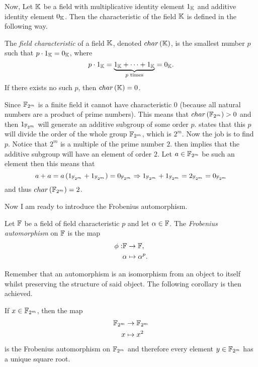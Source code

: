 Now, Let $\mathbb{K}$ be a field with multiplicative identity element $1_{\mathbb{K}}$ and additive identity element $0_{\mathbb{K}}$. Then the characteristic of the field $\mathbb{K}$ is defined in the following way.
\begin{defi}
\label{def:fieldChar}
	The \emph{field characteristic} of a field $\mathbb{K}$, denoted $char\left(\mathbb{K}\right)$, is the smallest number $p$ such that $p \cdot 1_{\mathbb{K}} = 0_{\mathbb{K}}$, where
	\[	
		p \cdot 1_{\mathbb{K}} = \underbrace{1_{\mathbb{K}} + \cdots + 1_{\mathbb{K}}}_{\text{$p$ times}} = 0_{\mathbb{K}}.
	\]
	If there exists no such $p$, then $char\left(\mathbb{K}\right) = 0$.
\end{defi}
Since $\mathbb{F}_{2^m}$ is a finite field it cannot have characteristic $0$ (because all natural numbers are a product of prime numbers). This means that $char\left(\mathbb{F}_{2^m}\right) > 0$ and then $1_{\mathbb{F}_{2^m}}$ will generate an additive subgroup of some order $p$.  states that this $p$ will divide the order of the whole group $\mathbb{F}_{2^m}$, which is $2^m$. Now the job is to find $p$. Notice that $2^m$ is a multiple of the prime number $2$.  then implies that the additive subgroup will have an element of order $2$. Let $a \in \mathbb{F}_{2^m}$ be such an element then this means that
\begin{equation}
\label{eq:cauchyHelper}
	a+a = a\left(1_{\mathbb{F}_{2^m}}+1_{\mathbb{F}_{2^m}}\right) = 0_{\mathbb{F}_{2^m}} \Rightarrow 1_{\mathbb{F}_{2^m}}+1_{\mathbb{F}_{2^m}} = 2_{\mathbb{F}_{2^m}} = 0_{\mathbb{F}_{2^m}}
\end{equation}
and thus $char\left(\mathbb{F}_{2^m}\right) = 2$.

Now I am ready to introduce the Frobenius automorphism.
\begin{defi}
	Let $\mathbb{F}$ be a field of field characteristic $p$ and let $\alpha \in \mathbb{F}$. The \emph{Frobenius automorphism} on $\mathbb{F}$ is the map
	\begin{align*}
		\phi: &\mathbb{F} \rightarrow \mathbb{F},\\
		&\alpha \mapsto \alpha^p.
	\end{align*}
\end{defi}
Remember that an automorphism is an isomorphism from an object to itself whilst preserving the structure of said object. The following corollary is then achieved.
\begin{cor}
\label{lem:uniqueSquareRoot}
	If $x \in \mathbb{F}_{2^m}$, then the map
	\begin{align*}
		\mathbb{F}_{2^m} &\rightarrow \mathbb{F}_{2^m}\\
		x &\mapsto x^2
	\end{align*}
	is the Frobenius automorphism on $\mathbb{F}_{2^m}$ and therefore every element $y \in \mathbb{F}_{2^m}$ has a unique square root.
\end{cor}

